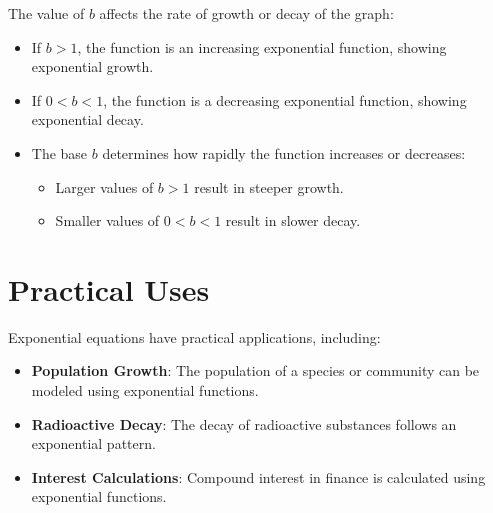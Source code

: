 \documentclass{article}
\begin{document}
\begin{center}
\end{center}

The value of \(b\) affects the rate of growth or decay of the graph:
\begin{itemize}
    \item If \(b > 1\), the function is an increasing exponential function, showing exponential growth.
    \item If \(0 < b < 1\), the function is a decreasing exponential function, showing exponential decay.
    \item The base \(b\) determines how rapidly the function increases or decreases:
    \begin{itemize}
        \item Larger values of \(b > 1\) result in steeper growth.
        \item Smaller values of \(0 < b < 1\) result in slower decay.
    \end{itemize}
\end{itemize}

\section*{Practical Uses}
Exponential equations have practical applications, including:
\begin{itemize}
    \item \textbf{Population Growth}: The population of a species or community can be modeled using exponential functions.
    \item \textbf{Radioactive Decay}: The decay of radioactive substances follows an exponential pattern.
    \item \textbf{Interest Calculations}: Compound interest in finance is calculated using exponential functions.
\end{itemize}
\end{document}
